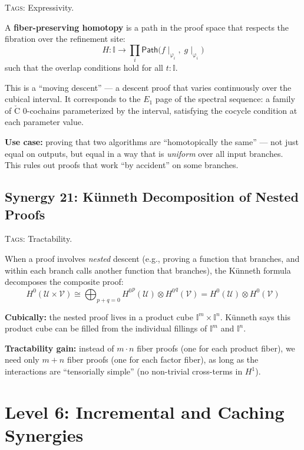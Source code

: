 \documentclass[11pt,a4paper]{article}
\theoremstyle{definition}
\theoremstyle{plain}
\newcommand{\Path}{\mathsf{Path}}
\newcommand{\Cech}{\check{\mathrm{C}}}
\newcommand{\covers}{\mathcal{U}}
\newcommand{\Hzero}{H^0}
\newcommand{\Hone}{H^1}
\newcommand{\restr}[2]{#1\!\!\mid_{#2}}
\newcommand{\interval}{\mathbb{I}}
\begin{document}
\textsc{Tags:} Expressivity.

\medskip\noindent
A \textbf{fiber-preserving homotopy} is a path in the
proof space that respects the fibration over the refinement site:
\[
  H : \interval \to \prod_{i} \Path\bigl(
  \restr{f}{\varphi_i},\;\restr{g}{\varphi_i}\bigr)
\]
such that the overlap conditions hold for all $t : \interval$.

This is a ``moving descent'' --- a descent proof that varies
continuously over the cubical interval.  It corresponds to the
$E_1$ page of the spectral sequence: a family of $\Cech$ $0$-cochains
parameterized by the interval, satisfying the cocycle condition
at each parameter value.

\textbf{Use case:} proving that two algorithms are ``homotopically
the same'' --- not just equal on outputs, but equal in a way
that is \emph{uniform} over all input branches.  This rules out
proofs that work ``by accident'' on some branches.


\subsection{Synergy 21: K\"unneth Decomposition of Nested Proofs}
\label{sec:syn-nested-kunneth}

\textsc{Tags:} Tractability.

\medskip\noindent
When a proof involves \emph{nested} descent (e.g., proving a
function that branches, and within each branch calls another
function that branches), the K\"unneth formula decomposes the
composite proof:
\[
  \Hzero(\covers \times \mathcal{V})
  \cong
  \bigoplus_{p+q=0} {\Hzero}^{p}(\covers) \otimes {\Hzero}^{q}(\mathcal{V})
  = \Hzero(\covers) \otimes \Hzero(\mathcal{V})
\]

\textbf{Cubically:} the nested proof lives in a product cube
$\interval^m \times \interval^n$.  K\"unneth says this product
cube can be filled from the individual fillings of $\interval^m$
and $\interval^n$.

\textbf{Tractability gain:} instead of $m \cdot n$ fiber proofs
(one for each product fiber), we need only $m + n$ fiber proofs
(one for each factor fiber), as long as the interactions are
``tensorially simple'' (no non-trivial cross-terms in $\Hone$).


\section{Level 6: Incremental and Caching Synergies}
\label{sec:syn-incremental}
\end{document}
